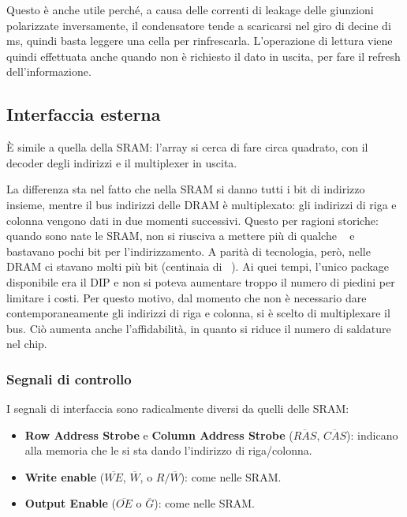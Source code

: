 \documentclass[11pt,4paper]{report}
\begin{document}
Questo è anche utile perché, a causa delle correnti di leakage delle giunzioni polarizzate inversamente, il condensatore tende a scaricarsi nel giro di decine di \si{\milli\second}, quindi basta leggere una cella per rinfrescarla. L'operazione di lettura viene quindi effettuata anche quando non è richiesto il dato in uscita, per fare il refresh dell'informazione.

\subsection{Interfaccia esterna}
È simile a quella della SRAM: l'array si cerca di fare circa quadrato, con il decoder degli indirizzi e il multiplexer in uscita.

La differenza sta nel fatto che nella SRAM si danno tutti i bit di indirizzo insieme, mentre il bus indirizzi delle DRAM è multiplexato: gli indirizzi di riga e colonna vengono dati in due momenti successivi. Questo per ragioni storiche: quando sono nate le SRAM, non si riusciva a mettere più di qualche \si{\kilo\bit} e bastavano pochi bit per l'indirizzamento. A parità di tecnologia, però, nelle DRAM ci stavano molti più bit (centinaia di \si{\kilo\byte}). Ai quei tempi, l'unico package disponibile era il DIP e non si poteva aumentare troppo il numero di piedini per limitare i costi. Per questo motivo, dal momento che non è necessario dare contemporaneamente gli indirizzi di riga e colonna, si è scelto di multiplexare il bus. Ciò aumenta anche l'affidabilità, in quanto si riduce il numero di saldature nel chip.

\subsubsection{Segnali di controllo}
I segnali di interfaccia sono radicalmente diversi da quelli delle SRAM:
\begin{itemize}
	\item \textbf{Row Address Strobe} e \textbf{Column Address Strobe} ($\overline{RAS}$, $\overline{CAS}$): indicano alla memoria che le si sta dando l'indirizzo di riga/colonna.
	\item \textbf{Write enable} ($\overline{WE}$, $\overline{W}$, o $R/\overline{W}$): come nelle SRAM.
	\item \textbf{Output Enable} ($\overline{OE}$ o $\overline{G}$): come nelle SRAM.
\end{itemize}
\end{document}
